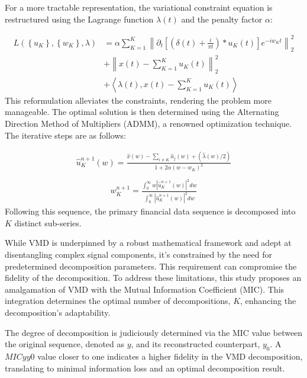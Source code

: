 \documentclass[sn-mathphys,Numbered]{sn-jnl}
\theoremstyle{thmstyleone}%
\theoremstyle{thmstyletwo}%
\theoremstyle{thmstylethree}%
\begin{document}
For a more tractable representation, the variational constraint equation is restructured using the Lagrange function \( \lambda(t) \) and the penalty factor \( \alpha \):

\begin{equation}
\begin{aligned}
L\left(\left\{u_K\right\},\left\{w_K\right\}, \lambda\right) &= \alpha \sum_{K=1}^K \left\| \partial_t \left[ \left( \delta(t) + \frac{i}{\pi t} \right) * u_K(t) \right] e^{-i w_K t} \right\|_2^2 \\
&+ \left\| x(t) - \sum_{K=1}^K u_K(t) \right\|_2^2 \\
&+ \left\langle \lambda(t), x(t) - \sum_{K=1}^K u_K(t) \right\rangle
\end{aligned}
\end{equation}
This reformulation alleviates the constraints, rendering the problem more manageable. The optimal solution is then determined using the Alternating Direction Method of Multipliers (ADMM), a renowned optimization technique. The iterative steps are as follows:

\begin{equation}
\begin{gathered}
\hat{u}_K^{n+1}(w)=\frac{\hat{x}(w)-\sum_{i \neq K} \hat{u}_j(w)+(\hat{\lambda}(w) / 2)}{1+2 \alpha\left(w-w_K\right)^2} \\
\end{gathered}
\end{equation}
\begin{equation}
\begin{gathered}
w_K^{n+1}=\frac{\int_0^{\infty} w\left|\hat{u}_K^{n+1}(w)\right|^2 d w}{\int_0^{\infty}\left|\hat{u}_K^{n+1}(w)\right|^2 d w}
\end{gathered}
\end{equation}
Following this sequence, the primary financial data sequence is decomposed into \( K \) distinct sub-series.

While VMD is underpinned by a robust mathematical framework and adept at disentangling complex signal components, it's constrained by the need for predetermined decomposition parameters. This requirement can compromise the fidelity of the decomposition. To address these limitations, this study proposes an amalgamation of VMD with the Mutual Information Coefficient (MIC)\cite{lin2022using}. This integration determines the optimal number of decompositions, \( K \), enhancing the decomposition's adaptability.

The degree of decomposition is judiciously determined via the MIC value between the original sequence, denoted as \( y \), and its reconstructed counterpart, \( y_0 \). A \( MICyy0 \) value closer to one indicates a higher fidelity in the VMD decomposition, translating to minimal information loss and an optimal decomposition result.
\end{document}

